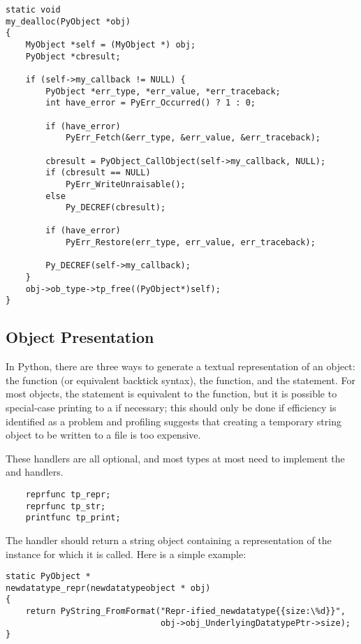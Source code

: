 \begin{verbatim}
static void
my_dealloc(PyObject *obj)
{
    MyObject *self = (MyObject *) obj;
    PyObject *cbresult;

    if (self->my_callback != NULL) {
        PyObject *err_type, *err_value, *err_traceback;
        int have_error = PyErr_Occurred() ? 1 : 0;

        if (have_error)
            PyErr_Fetch(&err_type, &err_value, &err_traceback);

        cbresult = PyObject_CallObject(self->my_callback, NULL);
        if (cbresult == NULL)
            PyErr_WriteUnraisable();
        else
            Py_DECREF(cbresult);

        if (have_error)
            PyErr_Restore(err_type, err_value, err_traceback);

        Py_DECREF(self->my_callback);
    }
    obj->ob_type->tp_free((PyObject*)self);
}
\end{verbatim}


\subsection{Object Presentation}

In Python, there are three ways to generate a textual representation
of an object: the  function (or
equivalent backtick syntax), the 
function, and the  statement.  For most objects, the
 statement is equivalent to the 
function, but it is possible to special-case printing to a
 if necessary; this should only be done if efficiency is
identified as a problem and profiling suggests that creating a
temporary string object to be written to a file is too expensive.

These handlers are all optional, and most types at most need to
implement the  and  handlers.

\begin{verbatim}
    reprfunc tp_repr;
    reprfunc tp_str;
    printfunc tp_print;
\end{verbatim}

The  handler should return a string object containing
a representation of the instance for which it is called.  Here is a
simple example:

\begin{verbatim}
static PyObject *
newdatatype_repr(newdatatypeobject * obj)
{
    return PyString_FromFormat("Repr-ified_newdatatype{{size:\%d}}",
                               obj->obj_UnderlyingDatatypePtr->size);
}
\end{verbatim}

